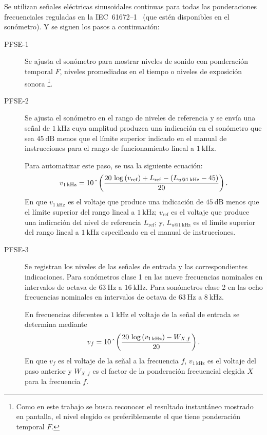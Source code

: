 Se utilizan señales eléctricas sinusoidales continuas para todas las ponderaciones frecuenciales reguladas en la \mbox{IEC 61672--1}~\citeyearpar{IEC_TC29_2013_1} (que estén disponibles en el sonómetro).
Y se siguen los pasos a continuación:
%
\begin{description}
    \item[PFSE-1] Se ajusta el sonómetro para mostrar niveles de sonido con ponderación temporal $F$, niveles promediados en el tiempo o niveles de exposición sonora \footnote{Como en este trabajo se busca reconocer el resultado instantáneo mostrado en pantalla, el nivel elegido es preferiblemente el que tiene ponderación temporal $F$.}.

    \item[PFSE-2] Se ajusta el sonómetro en el rango de niveles de referencia y se envía una señal de $\qty{1}{\kHz}$ cuya amplitud produzca una indicación en el sonómetro que sea $\qty{45}{\dB}$ menos que el límite superior indicado en el manual de instrucciones para el rango de funcionamiento lineal a $\qty{1}{\kHz}$.

    Para automatizar este paso, se usa la siguiente ecuación:
%
    \begin{equation}
        \label{eq:voltage_1khz}
        v_{\qty{1}{\kHz}} = 10\,\hat{\mkern6mu}
        \left(\frac{20\,\log\left(v_{\mathrm{ref}}\right) + L_{\mathrm{ref}} - \left(L_{u@\qty{1}{\kHz}} - 45\right)}{20}\right).
    \end{equation}
%
    En que $v_{\qty{1}{\kHz}}$ es el voltaje que produce una indicación de $\qty{45}{\dB}$ menos que el límite superior del rango lineal a $\qty{1}{\kHz}$; $v_{\mathrm{ref}}$ es el voltaje que produce una indicación del nivel de referencia $L_{\mathrm{ref}}$; y, $L_{u@\qty{1}{\kHz}}$ es el límite superior del rango lineal a $\qty{1}{\kHz}$ especificado en el manual de instrucciones.

    \item[PFSE-3] Se registran los niveles de las señales de entrada y las correspondientes indicaciones.
    Para sonómetros clase 1 en las nueve frecuencias nominales en intervalos de octava de $\qty{63}{\Hz}$ a $\qty{16}{\kHz}$.
    Para sonómetros clase 2 en las ocho frecuencias nominales en intervalos de octava de $\qty{63}{\Hz}$ a $\qty{8}{\kHz}$.

    En frecuencias diferentes a $\qty{1}{\kHz}$ el voltaje de la señal de entrada se determina mediante
%
    \begin{equation}
        \label{eq:voltage_by_frequency}
        v_f = 10\,\hat{\mkern6mu}\left(\frac{20\,\log\left(v_{\qty{1}{\kHz}}\right) - W_{X,f}}{20}\right).
    \end{equation}
%
    En que $v_f$ es el voltaje de la señal a la frecuencia $f$, $v_{\qty{1}{\kHz}}$ es el voltaje del paso anterior y $W_{X,f}$ es el factor de la ponderación frecuencial elegida $X$ para la frecuencia $f$.


\end{description}
